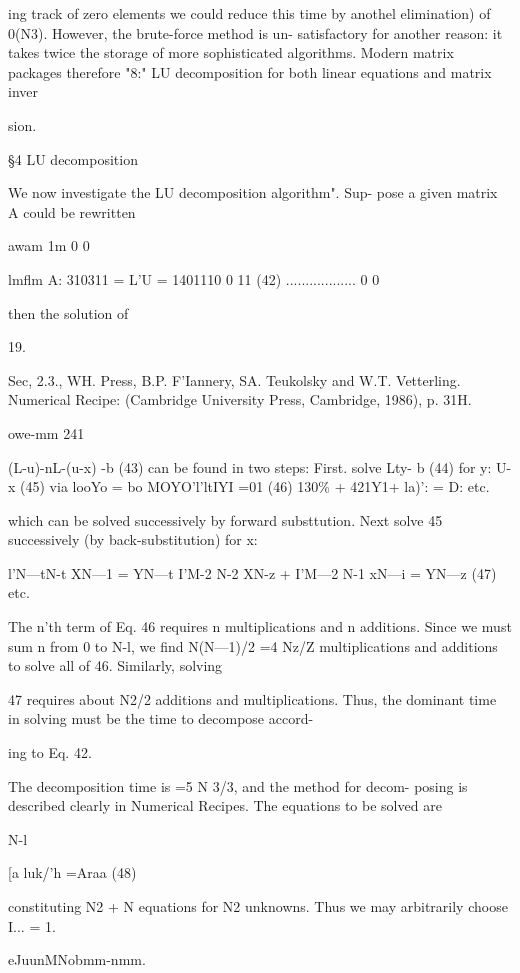 {{{{{{{{ing track of zero elements we could reduce this time by anothel
elimination) of 0(N3). However, the brute-force method is un-
satisfactory for another reason: it takes twice the storage of more
sophisticated algorithms. Modern matrix packages therefore "8:"
LU decomposition for both linear equations and matrix inver~

sion.

 

\S4 LU decomposition

We now investigate the LU decomposition algorithm". Sup-
pose a given matrix A could be rewritten

awam 1m 0 0 }lmflm
A: 310311 = L'U = 1401110 0  11 (42)
.................. 0 0

then the solution of

 

19.

Sec, 2.3., WH. Press, B.P. F'Iannery, SA. Teukolsky and W.T. Vetterling. Numerical Recipe:
(Cambridge University Press, Cambridge, 1986), p. 31H.

owe-mm 241

(L-u)-nL-(u-x) -b (43)
can be found in two steps: First. solve
Lty- b (44)
for
y: U-x (45)
via
looYo = bo
MOYO'l'ltIYI =01 (46)
130\% + 421Y1+ la)': = D:
etc.

which can be solved successively by forward substtution. Next
solve 45 successively (by back-substitution) for x:

l'N—tN-t XN—1 = YN—t
I'M-2 N-2 XN-z + I'M—2 N-1 xN—i = YN—z (47)
etc.

The n'th term of Eq. 46 requires n multiplications and n additions.
Since we must sum n from 0 to N-l, we ﬁnd N(N—1)/2 =4 Nz/Z
multiplications and additions to solve all of 46. Similarly, solving

47 requires about N2/2 additions and multiplications. Thus, the
dominant time in solving must be the time to decompose accord-

ing to Eq. 42.

The decomposition time is =5 N 3/3, and the method for decom-
posing is described clearly in Numerical Recipes. The equations
to be solved are

N-l

[a luk/'h =Araa (48)

constituting N2 + N equations for N2 unknowns. Thus we may
arbitrarily choose I... = 1.

eJuunMNobmm-nmm.

}}}}}}}
